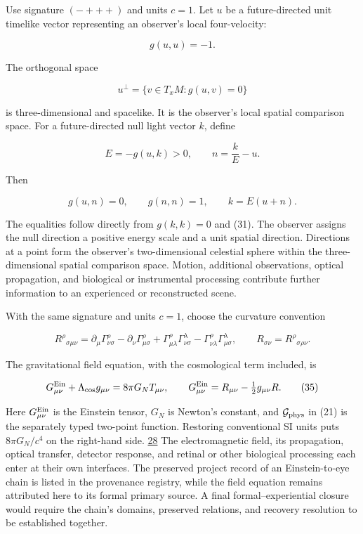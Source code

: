 Use signature \((-+++)\) and units \(c=1\). Let \(u\) be a future-directed unit timelike vector representing an observer's local four-velocity:

\[
g(u,u)=-1.
\tag{31}
\]

The orthogonal space

\[
u^\perp=\{v\in T_xM:g(u,v)=0\}
\tag{32}
\]

is three-dimensional and spacelike. It is the observer's local spatial comparison space. For a future-directed null light vector \(k\), define

\[
E=-g(u,k)>0,
\qquad
n=\frac{k}{E}-u.
\tag{33}
\]

Then

\[
g(u,n)=0,
\qquad
g(n,n)=1,
\qquad
k=E(u+n).
\tag{34}
\]

The equalities follow directly from \(g(k,k)=0\) and (31). The observer assigns the null direction a positive energy scale and a unit spatial direction. Directions at a point form the observer's two-dimensional celestial sphere within the three-dimensional spatial comparison space. Motion, additional observations, optical propagation, and biological or instrumental processing contribute further information to an experienced or reconstructed scene.

With the same signature and units \(c=1\), choose the curvature convention

\[
R^\rho{}_{\sigma\mu\nu}=
\partial_\mu\Gamma^\rho_{\nu\sigma}
-\partial_\nu\Gamma^\rho_{\mu\sigma}
+\Gamma^\rho_{\mu\lambda}\Gamma^\lambda_{\nu\sigma}
-\Gamma^\rho_{\nu\lambda}\Gamma^\lambda_{\mu\sigma},
\qquad R_{\sigma\nu}=R^\rho{}_{\sigma\rho\nu}.
\tag{34a}
\]

The gravitational field equation, with the cosmological term included, is

\[
G^{\rm Ein}_{\mu\nu}+\Lambda_{\rm cos}g_{\mu\nu}
=8\pi G_N T_{\mu\nu},
\qquad
G^{\rm Ein}_{\mu\nu}=R_{\mu\nu}-\tfrac12g_{\mu\nu}R.
\tag{35}
\]

Here \(G^{\rm Ein}_{\mu\nu}\) is the Einstein tensor, \(G_N\) is Newton's constant, and \(\mathcal G_{\rm phys}\) in (21) is the separately typed two-point function. Restoring conventional SI units puts \(8\pi G_N/c^4\) on the right-hand side. \href{https://doi.org/10.1002/andp.19163540702}{28} The electromagnetic field, its propagation, optical transfer, detector response, and retinal or other biological processing each enter at their own interfaces. The preserved project record of an Einstein-to-eye chain is listed in the provenance registry, while the field equation remains attributed here to its formal primary source. A final formal--experiential closure would require the chain's domains, preserved relations, and recovery resolution to be established together.

